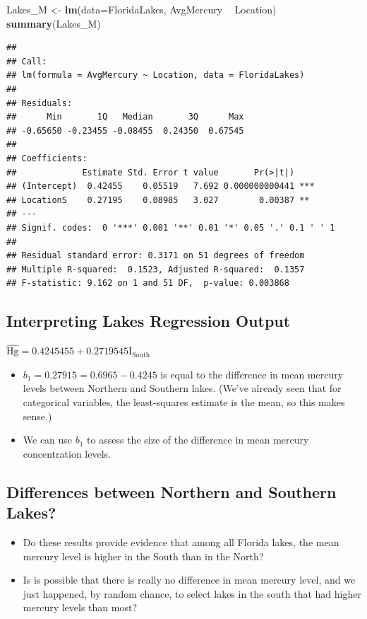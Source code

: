 \documentclass[]{book}
\newenvironment{Shaded}{\begin{snugshade}}{\end{snugshade}}
\newcommand{\KeywordTok}[1]{\textcolor[rgb]{0.13,0.29,0.53}{\textbf{#1}}}
\newcommand{\DataTypeTok}[1]{\textcolor[rgb]{0.13,0.29,0.53}{#1}}
\newcommand{\StringTok}[1]{\textcolor[rgb]{0.31,0.60,0.02}{#1}}
\newcommand{\OperatorTok}[1]{\textcolor[rgb]{0.81,0.36,0.00}{\textbf{#1}}}
\newcommand{\NormalTok}[1]{#1}
\begin{document}
\begin{Shaded}
\begin{Highlighting}[]
\NormalTok{Lakes_M <-}\StringTok{ }\KeywordTok{lm}\NormalTok{(}\DataTypeTok{data=}\NormalTok{FloridaLakes, AvgMercury }\OperatorTok{~}\StringTok{ }\NormalTok{Location)}
\KeywordTok{summary}\NormalTok{(Lakes_M)}
\end{Highlighting}
\end{Shaded}

\begin{verbatim}
## 
## Call:
## lm(formula = AvgMercury ~ Location, data = FloridaLakes)
## 
## Residuals:
##      Min       1Q   Median       3Q      Max 
## -0.65650 -0.23455 -0.08455  0.24350  0.67545 
## 
## Coefficients:
##             Estimate Std. Error t value       Pr(>|t|)    
## (Intercept)  0.42455    0.05519   7.692 0.000000000441 ***
## LocationS    0.27195    0.08985   3.027        0.00387 ** 
## ---
## Signif. codes:  0 '***' 0.001 '**' 0.01 '*' 0.05 '.' 0.1 ' ' 1
## 
## Residual standard error: 0.3171 on 51 degrees of freedom
## Multiple R-squared:  0.1523, Adjusted R-squared:  0.1357 
## F-statistic: 9.162 on 1 and 51 DF,  p-value: 0.003868
\end{verbatim}

\subsection{Interpreting Lakes Regression
Output}\label{interpreting-lakes-regression-output-1}

\(\widehat{\text{Hg}} = 0.4245455 +0.2719545\text{I}_{\text{South}}\)

\begin{itemize}
\item
  \(b_1 = 0.27915= 0.6965 - 0.4245\) is equal to the difference in mean
  mercury levels between Northern and Southern lakes. (We've already
  seen that for categorical variables, the least-squares estimate is the
  mean, so this makes sense.)
\item
  We can use \(b_1\) to assess the size of the difference in mean
  mercury concentration levels.
\end{itemize}

\subsection{Differences between Northern and Southern
Lakes?}\label{differences-between-northern-and-southern-lakes}

\begin{itemize}
\item
  Do these results provide evidence that among all Florida lakes, the
  mean mercury level is higher in the South than in the North?
\item
  Is is possible that there is really no difference in mean mercury
  level, and we just happened, by random chance, to select lakes in the
  south that had higher mercury levels than most?
\end{itemize}
\end{document}
